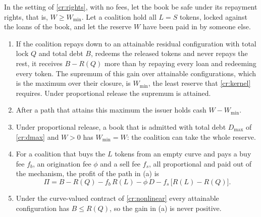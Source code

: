 \begin{proposition}\label{cr:extraction}
In the setting of \cref{cr:rights}, with no fees, let the book be safe under its repayment rights, that is, $W\ge W_{\min}$. Let a coalition hold all $L=S$ tokens, locked against the loans of the book, and let the reserve $W$ have been paid in by someone else.
\begin{enumerate}[label=(\alph*)]
\item If the coalition repays down to an attainable residual configuration with total lock $Q$ and total debt $B$, redeems the released tokens and never repays the rest, it receives $B-R(Q)$ more than by repaying every loan and redeeming every token. The supremum of this gain over attainable configurations, which is the maximum over their closure, is $W_{\min}$, the least reserve that \cref{cr:kernel} requires. Under proportional release the supremum is attained.
\item After a path that attains this maximum the issuer holds cash $W-W_{\min}$.
\item Under proportional release, a book that is admitted with total debt $D_{\max}$ of \eqref{cr:dmax} and $W>0$ has $W_{\min}=W$: the coalition can take the whole reserve.
\item For a coalition that buys the $L$ tokens from an empty curve and pays a buy fee $f_b$, an origination fee $\phi$ and a sell fee $f_s$, all proportional and paid out of the mechanism, the profit of the path in (a) is
\[
\Pi=B-R(Q)-f_b\,R(L)-\phi\,D-f_s\,\bigl[R(L)-R(Q)\bigr].
\]
\item Under the curve-valued contract of \cref{cr:nonlinear} every attainable configuration has $B\le R(Q)$, so the gain in (a) is never positive.
\end{enumerate}
\end{proposition}
